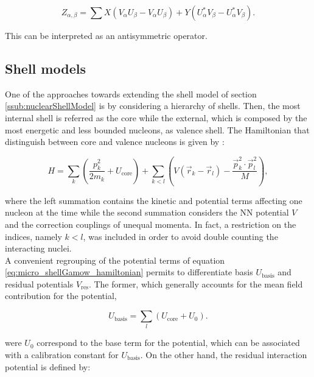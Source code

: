 \documentclass[openany]{book}
\begin{document}
\begin{equation}\label{eq:micro_QHFB_densityGround}
	Z_{\alpha, \beta} = \sum {X (V_\alpha U_\beta - V_\alpha U_\beta) + Y (U^{*}_\alpha V_\beta - U^{*}_\alpha V_\beta)}. 
\end{equation}

This can be interpreted as an antisymmetric operator. 



\subsection{Shell models}\label{sub_microscopical_shell}


One of the approaches towards extending the shell model of section \ref{ssub:nuclearShellModel} is by considering a hierarchy of shells. Then, the most internal shell is referred as the core while the external, which is composed by the most energetic and less bounded nucleons, as valence shell. The Hamiltonian that  distinguish between core and valence nucleons is given by  \cite{dong_wang_michel_ploszajczak_2022}:

\begin{equation}\label{eq:micro_shellGamow_hamiltonian}
	H = \sum_k  \left( \frac{p^2_k}{2m_k} + U_{\mathrm{core}} \right) + \sum_{k < l} \left( {V(\vec r_k - \vec r_l) - \frac{\vec p^2_k \cdot \vec p^2_l}{M}} \right),
\end{equation}

where the left summation contains the kinetic and potential terms affecting one nucleon at the time while the second summation considers the $\mathrm{NN}$ potential $V$ and the correction couplings of unequal momenta. In fact, a restriction on the indices, namely $k < l$, was included in order to avoid double counting the interacting nuclei. \\   

A convenient regrouping of the potential terms of equation \ref{eq:micro_shellGamow_hamiltonian} permits to differentiate basis $U_{\mathrm{basis}}$ and residual potentials $V_{\mathrm{res}}$. The former, which generally accounts for the mean field contribution for the potential, 

\begin{equation}\label{eq:micro_shellGamow_basis}
	U_{\mathrm{basis}} = \sum_l (  U_{\mathrm{core}} + U_0).
\end{equation}

were $U_0$ correspond to the base term for the potential, which can be associated with a calibration constant for $U_{\mathrm{basis}}$. On the other hand, the residual interaction potential is defined by: 
\end{document}
